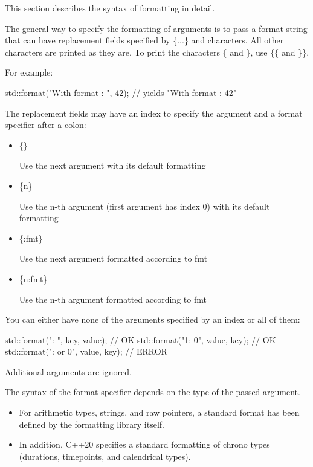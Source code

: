 
This section describes the syntax of formatting in detail.


The general way to specify the formatting of arguments is to pass a format string that can have replacement fields specified by \{...\} and characters. All other characters are printed as they are. To print the characters \{ and \}, use \{\{ and \}\}.

For example:

\begin{cpp}
std::format("With format {{}}: {}", 42); // yields "With format {}: 42"
\end{cpp}

The replacement fields may have an index to specify the argument and a format specifier after a colon:

\begin{itemize}
\item 
\{\}

Use the next argument with its default formatting

\item 
\{n\}

Use the n-th argument (first argument has index 0) with its default formatting

\item 
\{:fmt\}

Use the next argument formatted according to fmt

\item 
\{n:fmt\}

Use the n-th argument formatted according to fmt
\end{itemize}

You can either have none of the arguments specified by an index or all of them:

\begin{cpp}
std::format("{}: {}", key, value); // OK
std::format("{1}: {0}", value, key); // OK
std::format("{}: {} or {0}", value, key); // ERROR
\end{cpp}

Additional arguments are ignored.

The syntax of the format specifier depends on the type of the passed argument.

\begin{itemize}
\item 
For arithmetic types, strings, and raw pointers, a standard format has been defined by the formatting library itself.

\item 
In addition, C++20 specifies a standard formatting of chrono types (durations, timepoints, and calendrical types).
\end{itemize}

